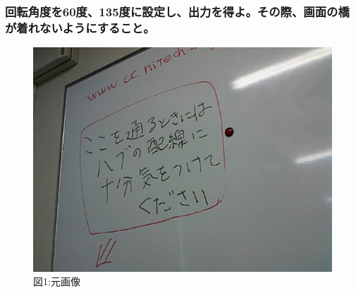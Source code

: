 ﻿\documentclass[a4j,11pt]{jarticle}
\begin{document}
\subsubsection{回転角度を60度、135度に設定し、出力を得よ。その際、画面の橋が着れないようにすること。}
\clearpage
\begin{figure}[tb]

 \center
 \includegraphics[width=0.8\hsize]{./eps/input.eps}
 \\図1:元画像
 \label{fig:affine1}


\end{figure}
\end{document}
